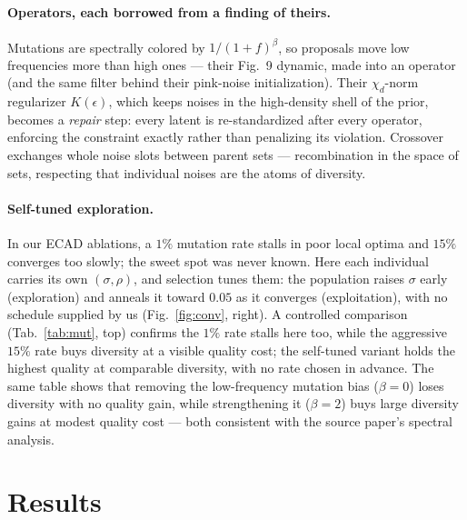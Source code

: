 \documentclass[10pt,twocolumn,letterpaper]{article}
\begin{document}
\paragraph{Operators, each borrowed from a finding of theirs.} Mutations are
spectrally colored by $1/(1{+}f)^{\beta}$, so proposals move low frequencies
more than high ones --- their Fig.~9 dynamic, made into an operator (and the
same filter behind their pink-noise initialization). Their $\chi_d$-norm
regularizer $K(\epsilon)$, which keeps noises in the high-density shell of the
prior, becomes a \emph{repair} step: every latent is re-standardized after
every operator, enforcing the constraint exactly rather than penalizing its
violation. Crossover exchanges whole noise slots between parent sets ---
recombination in the space of sets, respecting that individual noises are the
atoms of diversity.

\paragraph{Self-tuned exploration.} In our ECAD ablations, a $1\%$ mutation
rate stalls in poor local optima and $15\%$ converges too slowly; the sweet
spot was never known. Here each individual carries its own $(\sigma,\rho)$, and
selection tunes them: the population raises $\sigma$ early (exploration) and
anneals it toward $0.05$ as it converges (exploitation), with no schedule
supplied by us (Fig.~\ref{fig:conv}, right). A controlled comparison (Tab.~\ref{tab:mut}, top) confirms the $1\%$ rate
stalls here too, while the aggressive $15\%$ rate buys diversity at a visible
quality cost; the self-tuned variant holds the highest quality at comparable
diversity, with no rate chosen in advance. The same table shows that removing
the low-frequency mutation bias ($\beta{=}0$) loses diversity with no quality
gain, while strengthening it ($\beta{=}2$) buys large diversity gains at
modest quality cost --- both consistent with the source paper's spectral
analysis.

\section{Results}
\end{document}
